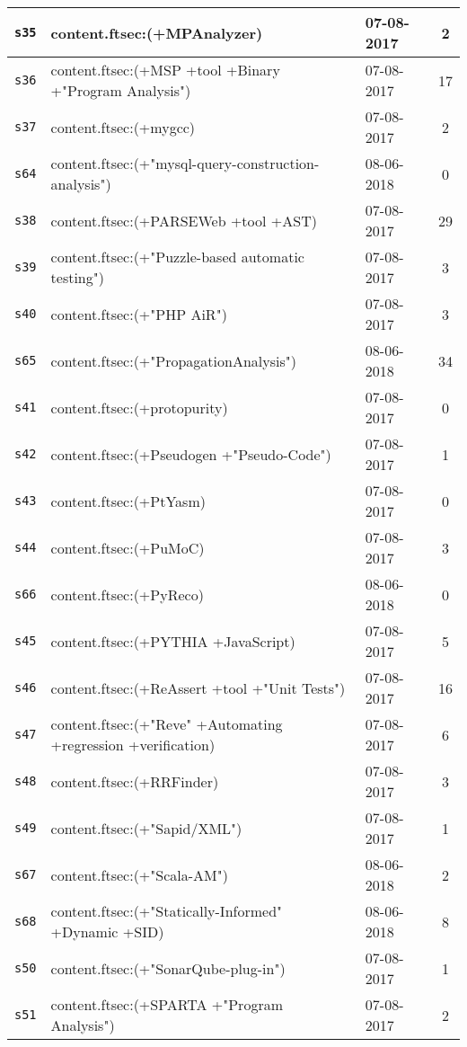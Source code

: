 \begin{longtable}{| l | p{13cm} | l | c |}
    \hline
\texttt{s35} & content.ftsec:(+MPAnalyzer) & 07-08-2017 & 2 \\
    \hline
\texttt{s36} & content.ftsec:(+MSP +tool +Binary +"Program Analysis") & 07-08-2017 & 17 \\
    \hline
\texttt{s37} & content.ftsec:(+mygcc) & 07-08-2017 & 2 \\
    \hline
\texttt{s64} & content.ftsec:(+"mysql-query-construction-analysis") & 08-06-2018 & 0 \\
    \hline
\texttt{s38} & content.ftsec:(+PARSEWeb +tool +AST) & 07-08-2017 & 29 \\
    \hline
\texttt{s39} & content.ftsec:(+"Puzzle-based automatic testing") & 07-08-2017 & 3 \\
    \hline
\texttt{s40} & content.ftsec:(+"PHP AiR") & 07-08-2017 & 3 \\
    \hline
\texttt{s65} & content.ftsec:(+"PropagationAnalysis") & 08-06-2018 & 34 \\
    \hline
\texttt{s41} & content.ftsec:(+protopurity) & 07-08-2017 & 0 \\
    \hline
\texttt{s42} & content.ftsec:(+Pseudogen +"Pseudo-Code") & 07-08-2017 & 1 \\
    \hline
\texttt{s43} & content.ftsec:(+PtYasm) & 07-08-2017 & 0 \\
    \hline
\texttt{s44} & content.ftsec:(+PuMoC) & 07-08-2017 & 3 \\
    \hline
\texttt{s66} & content.ftsec:(+PyReco) & 08-06-2018 & 0 \\
    \hline
\texttt{s45} & content.ftsec:(+PYTHIA +JavaScript) & 07-08-2017 & 5 \\
    \hline
\texttt{s46} & content.ftsec:(+ReAssert +tool +"Unit Tests") & 07-08-2017 & 16 \\
    \hline
\texttt{s47} & content.ftsec:(+"Reve" +Automating +regression +verification) & 07-08-2017 & 6 \\
    \hline
\texttt{s48} & content.ftsec:(+RRFinder) & 07-08-2017 & 3 \\
    \hline
\texttt{s49} & content.ftsec:(+"Sapid/XML") & 07-08-2017 & 1 \\
    \hline
\texttt{s67} & content.ftsec:(+"Scala-AM") & 08-06-2018 & 2 \\
    \hline
\texttt{s68} & content.ftsec:(+"Statically-Informed" +Dynamic +SID) & 08-06-2018 & 8 \\
    \hline
\texttt{s50} & content.ftsec:(+"SonarQube-plug-in") & 07-08-2017 & 1 \\
    \hline
\texttt{s51} & content.ftsec:(+SPARTA +"Program Analysis") & 07-08-2017 & 2 \\

\end{longtable}
